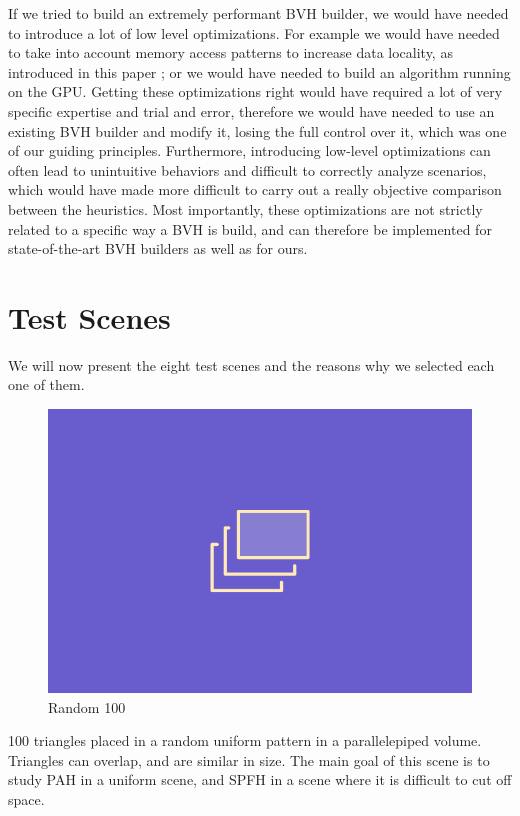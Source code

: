 \documentclass{PoliMi_MasterThesis}
\begin{document}
If we tried to build an extremely performant BVH builder, we would have needed to introduce a lot of low level optimizations. For example we would have needed to take into account memory access patterns to increase data locality, as introduced in this paper \cite{TODO}; or we would have needed to build an algorithm running on the GPU. Getting these optimizations right would have required a lot of very specific expertise and trial and error, therefore we would have needed to use an existing BVH builder and modify it, losing the full control over it, which was one of our guiding principles. Furthermore, introducing low-level optimizations can often lead to unintuitive behaviors and difficult to correctly analyze scenarios, which would have made more difficult to carry out a really objective comparison between the heuristics. Most importantly, these optimizations are not strictly related to a specific way a BVH is build, and can therefore be implemented for state-of-the-art BVH builders as well as for ours.

\section{Test Scenes} \label{sec:test_scenes}
We will now present the eight test scenes and the reasons why we selected each one of them.
\begin{minipage}{0.4\textwidth}
	\begin{figure}[H]
		\includegraphics[width=\textwidth]{Images/TODO.png}
		\caption{Random 100}
		\label{fig:random_100}
	\end{figure}
\end{minipage} \hfill
\begin{minipage}{0.55\textwidth}
	100 triangles placed in a random uniform pattern in a parallelepiped volume. Triangles can overlap, and are similar in size. The main goal of this scene is to study PAH in a uniform scene, and SPFH in a scene where it is difficult to cut off space.\\
\end{minipage}
\end{document}
